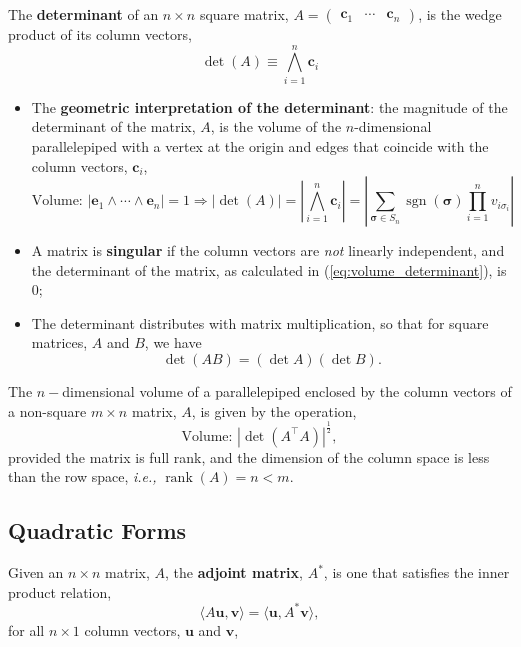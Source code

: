 \documentclass[12pt, twoside, draft]{article}
\begin{document}
The \textbf{determinant} of an $n \times n$ square matrix, $A = \begin{pmatrix} \mathbf{c}_1 & \cdots & \mathbf{c}_n \end{pmatrix}$, is the wedge product of its column vectors,
\begin{equation}\label{eq:determinant}
\det \left( A \right) \equiv \bigwedge_{i=1}^n \mathbf{c}_i 
\end{equation}
\begin{itemize}
\item The \textbf{geometric interpretation of the determinant}: the magnitude of the determinant of the matrix, $A$, is the volume of the $n$-dimensional parallelepiped with a vertex at the origin and edges that coincide with the column vectors, $\mathbf{c}_i$,
\begin{equation}\label{eq:volume_determinant}
\text{Volume: } | \mathbf{e}_1 \wedge \cdots \wedge \mathbf{e}_n | = 1 \Rightarrow| \det (A) | = \left| \bigwedge_{i=1}^n \mathbf{c}_i \right| = \left| \sum_{\bm{\sigma} \in S_n} \operatorname{sgn}(\bm{\sigma}) \prod_{i=1}^n v_{i \sigma_i} \right|
\end{equation}
\item A matrix is \textbf{singular} if the column vectors are \textit{not} linearly independent, and the determinant of the matrix, as calculated in (\ref{eq:volume_determinant}), is 0;
\item The determinant distributes with matrix multiplication, so that for square matrices, $A$ and $B$, we have
\begin{equation}
\operatorname{det} (AB) = \left( \operatorname{det} A \right) \left( \operatorname{det} B \right).
\end{equation}
\end{itemize}

The $n-$dimensional volume of a parallelepiped enclosed by the column vectors of a non-square $m \times n$ matrix, $A$, is given by the operation,
\begin{equation}\label{eq:nonsquare_parallelepiped_volume}
\text{Volume: } | \operatorname{det} (A^\top A) |^\frac{1}{2},
\end{equation}
provided the matrix is full rank, and the dimension of the column space is less than the row space, \textit{i.e.,} $\operatorname{rank} (A) = n < m$.

\subsection{Quadratic Forms}\label{sec:quadratic-forms}
Given an $n \times n$ matrix, $A$, the \textbf{adjoint matrix}, $A^*$, is one that satisfies the inner product relation,
\begin{equation}\label{eq:adjoint_matrix}
\langle A \mathbf{u}, \mathbf{v} \rangle = \langle \mathbf{u}, A^* \mathbf{v} \rangle,
\end{equation}
for all $n \times 1$ column vectors, $\mathbf{u}$ and $\mathbf{v}$,
\end{document}
